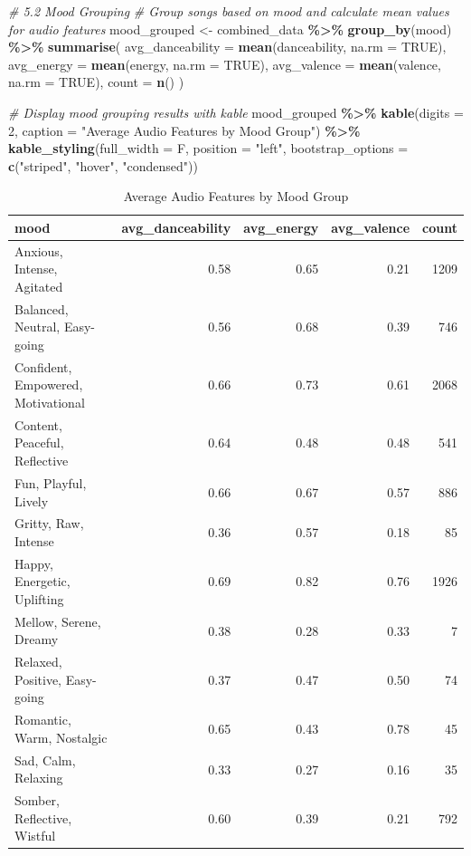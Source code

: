 \documentclass[
]{article}
\newenvironment{Shaded}{\begin{snugshade}}{\end{snugshade}}
\newcommand{\AttributeTok}[1]{\textcolor[rgb]{0.13,0.29,0.53}{#1}}
\newcommand{\CommentTok}[1]{\textcolor[rgb]{0.56,0.35,0.01}{\textit{#1}}}
\newcommand{\ConstantTok}[1]{\textcolor[rgb]{0.56,0.35,0.01}{#1}}
\newcommand{\DecValTok}[1]{\textcolor[rgb]{0.00,0.00,0.81}{#1}}
\newcommand{\FunctionTok}[1]{\textcolor[rgb]{0.13,0.29,0.53}{\textbf{#1}}}
\newcommand{\NormalTok}[1]{#1}
\newcommand{\OtherTok}[1]{\textcolor[rgb]{0.56,0.35,0.01}{#1}}
\newcommand{\SpecialCharTok}[1]{\textcolor[rgb]{0.81,0.36,0.00}{\textbf{#1}}}
\newcommand{\StringTok}[1]{\textcolor[rgb]{0.31,0.60,0.02}{#1}}
\begin{document}
\begin{Shaded}
\begin{Highlighting}[]
\CommentTok{\# 5.2 Mood Grouping}
\CommentTok{\# Group songs based on mood and calculate mean values for audio features}
\NormalTok{mood\_grouped }\OtherTok{\textless{}{-}}\NormalTok{ combined\_data }\SpecialCharTok{\%\textgreater{}\%}
  \FunctionTok{group\_by}\NormalTok{(mood) }\SpecialCharTok{\%\textgreater{}\%}
  \FunctionTok{summarise}\NormalTok{(}
    \AttributeTok{avg\_danceability =} \FunctionTok{mean}\NormalTok{(danceability, }\AttributeTok{na.rm =} \ConstantTok{TRUE}\NormalTok{),}
    \AttributeTok{avg\_energy =} \FunctionTok{mean}\NormalTok{(energy, }\AttributeTok{na.rm =} \ConstantTok{TRUE}\NormalTok{),}
    \AttributeTok{avg\_valence =} \FunctionTok{mean}\NormalTok{(valence, }\AttributeTok{na.rm =} \ConstantTok{TRUE}\NormalTok{),}
    \AttributeTok{count =} \FunctionTok{n}\NormalTok{()}
\NormalTok{  )}

\CommentTok{\# Display mood grouping results with kable}
\NormalTok{mood\_grouped }\SpecialCharTok{\%\textgreater{}\%}
  \FunctionTok{kable}\NormalTok{(}\AttributeTok{digits =} \DecValTok{2}\NormalTok{, }\AttributeTok{caption =} \StringTok{"Average Audio Features by Mood Group"}\NormalTok{) }\SpecialCharTok{\%\textgreater{}\%}
  \FunctionTok{kable\_styling}\NormalTok{(}\AttributeTok{full\_width =}\NormalTok{ F, }\AttributeTok{position =} \StringTok{"left"}\NormalTok{, }\AttributeTok{bootstrap\_options =} \FunctionTok{c}\NormalTok{(}\StringTok{"striped"}\NormalTok{, }\StringTok{"hover"}\NormalTok{, }\StringTok{"condensed"}\NormalTok{))}
\end{Highlighting}
\end{Shaded}

\begin{longtable}[l]{lrrrr}
\caption{\label{tab:unnamed-chunk-10}Average Audio Features by Mood Group}\\
\toprule
mood & avg\_danceability & avg\_energy & avg\_valence & count\\
\midrule
Anxious, Intense, Agitated & 0.58 & 0.65 & 0.21 & 1209\\
Balanced, Neutral, Easy-going & 0.56 & 0.68 & 0.39 & 746\\
Confident, Empowered, Motivational & 0.66 & 0.73 & 0.61 & 2068\\
Content, Peaceful, Reflective & 0.64 & 0.48 & 0.48 & 541\\
Fun, Playful, Lively & 0.66 & 0.67 & 0.57 & 886\\
\addlinespace
Gritty, Raw, Intense & 0.36 & 0.57 & 0.18 & 85\\
Happy, Energetic, Uplifting & 0.69 & 0.82 & 0.76 & 1926\\
Mellow, Serene, Dreamy & 0.38 & 0.28 & 0.33 & 7\\
Relaxed, Positive, Easy-going & 0.37 & 0.47 & 0.50 & 74\\
Romantic, Warm, Nostalgic & 0.65 & 0.43 & 0.78 & 45\\
\addlinespace
Sad, Calm, Relaxing & 0.33 & 0.27 & 0.16 & 35\\
Somber, Reflective, Wistful & 0.60 & 0.39 & 0.21 & 792\\
\bottomrule
\end{longtable}
\end{document}
